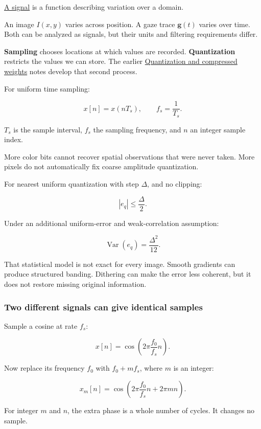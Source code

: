 \hyperref[appendix-1077ea8fc737]{A signal} is a function describing variation over a domain.

An image \(I(x,y)\) varies across position. A gaze trace \(\mathbf g(t)\) varies over time. Both can be analyzed as signals, but their units and filtering requirements differ.

\textbf{Sampling} chooses locations at which values are recorded. \textbf{Quantization} restricts the values we can store. The earlier \hyperref[appendix-fdc7879e8bf2]{Quantization and compressed weights} notes develop that second process.

For uniform time sampling:

\[
x[n]=x(nT_s),\qquad f_s=\frac1{T_s}.
\]

\(T_s\) is the sample interval, \(f_s\) the sampling frequency, and \(n\) an integer sample index.

More color bits cannot recover spatial observations that were never taken. More pixels do not automatically fix coarse amplitude quantization.

For nearest uniform quantization with step \(\Delta\), and no clipping:

\[
|e_q|\leq\frac{\Delta}{2}.
\]

Under an additional uniform-error and weak-correlation assumption:

\[
\operatorname{Var}(e_q)=\frac{\Delta^2}{12}.
\]

That statistical model is not exact for every image. Smooth gradients can produce structured banding. Dithering can make the error less coherent, but it does not restore missing original information.

\subsubsection{Two different signals can give identical samples}\label{04-visual-computing-ii-ch043-two-different-signals-can-give-identical-samples}

Sample a cosine at rate \(f_s\):

\[
x[n]=\cos\left(2\pi\frac{f_0}{f_s}n\right).
\]

Now replace its frequency \(f_0\) with \(f_0+mf_s\), where \(m\) is an integer:

\[
x_m[n]
=\cos\left(2\pi\frac{f_0}{f_s}n+2\pi mn\right).
\]

For integer \(m\) and \(n\), the extra phase is a whole number of cycles. It changes no sample.

